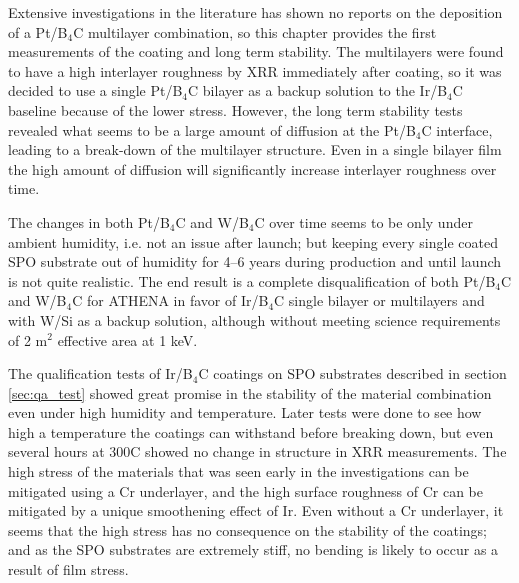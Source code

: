 Extensive investigations in the literature has shown no reports on the deposition of a Pt/B$_4$C multilayer combination, so this chapter provides the first measurements of the coating and long term stability. The multilayers were found to have a high interlayer roughness by XRR immediately after coating, so it was decided to use a single Pt/B$_4$C bilayer as a backup solution to the Ir/B$_4$C baseline because of the lower stress. However, the long term stability tests revealed what seems to be a large amount of diffusion at the Pt/B$_4$C interface, leading to a break-down of the multilayer structure. Even in a single bilayer film the high amount of diffusion will significantly increase interlayer roughness over time.

The changes in both Pt/B$_4$C and W/B$_4$C over time seems to be only under ambient humidity, i.e. not an issue after launch; but keeping every single coated SPO substrate out of humidity for 4--6 years during production and until launch is not quite realistic. The end result is a complete disqualification of both Pt/B$_4$C and W/B$_4$C for ATHENA in favor of Ir/B$_4$C single bilayer or multilayers and with W/Si as a backup solution, although without meeting science requirements of 2 m$^2$ effective area at 1 keV.

The qualification tests of Ir/B$_4$C coatings on SPO substrates described in section \ref{sec:qa_test} showed great promise in the stability of the material combination even under high humidity and temperature. Later tests were done to see how high a temperature the coatings can withstand before breaking down, but even several hours at 300\degr C showed no change in structure in XRR measurements. The high stress of the materials that was seen early in the investigations can be mitigated using a Cr underlayer, and the high surface roughness of Cr can be mitigated by a unique smoothening effect of Ir. Even without a Cr underlayer, it seems that the high stress has no consequence on the stability of the coatings; and as the SPO substrates are extremely stiff, no bending is likely to occur as a result of film stress.

